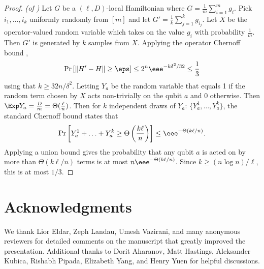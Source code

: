 \documentclass{toc}
\begin{document}
\begin{proof}\textit{(of )}
Let $G$ be a $(\ell, D)$-local Hamiltonian where $G = \frac{1}{m} \sum_{i = 1}^m g_i$. Pick $i_1, \ldots, i_k$ uniformly randomly from $[m]$ and let $G' = \frac{1}{k} \sum_{j = 1}^k g_{i_j}$. Let $X$ be the operator-valued random variable which takes on the value $g_i$ with probability $\frac{1}{m}$. Then $G'$ is generated by $k$ samples from $X$. Applying the operator Chernoff bound \cite[Lemma 2.8]{tropp},
\begin{align}
    \Pr\left[\|H'-H\|\geq \eps\right]\leq 2^n \eee^{-k \delta^2/32} \leq \frac{1}{3}
\end{align}
using that $k \geq 32n/\delta^2$. Letting $Y_a$ be the random variable that equals 1 if the random term chosen by $X$ acts non-trivially on the qubit $a$ and 0 otherwise. Then $\Exp Y_a = \frac{D}{m} = \Theta(\frac{\ell}{n})$. Then for $k$ independent draws of $Y_a$: $\{Y_a^1, \ldots, Y_a^k\}$, the standard Chernoff bound states that
\begin{align}
    \Pr \left[ Y_a^1 + \ldots + Y_a^k \geq \Theta \left( \frac{k\ell}{n}\right) \right] \leq \eee^{-\Theta(k \ell/n)}.
\end{align}
Applying a union bound gives the probability that any qubit $a$ is acted on by more than $\Theta(k \ell/n)$ terms is at most $n \eee^{-\Theta(k\ell/n)}$. Since $k \geq (n \log n) / \ell$, this is at most $1/3$.
\end{proof}


\section*{Acknowledgments}
We thank Lior Eldar, Zeph Landau, Umesh Vazirani, and many anonymous reviewers for detailed comments on the manuscript that greatly improved the presentation. Additional thanks to Dorit Aharanov, Matt Hastings, Aleksander Kubica, Rishabh Pipada, Elizabeth Yang, and Henry Yuen for helpful discussions. 



%
%
%
%

\end{document}
